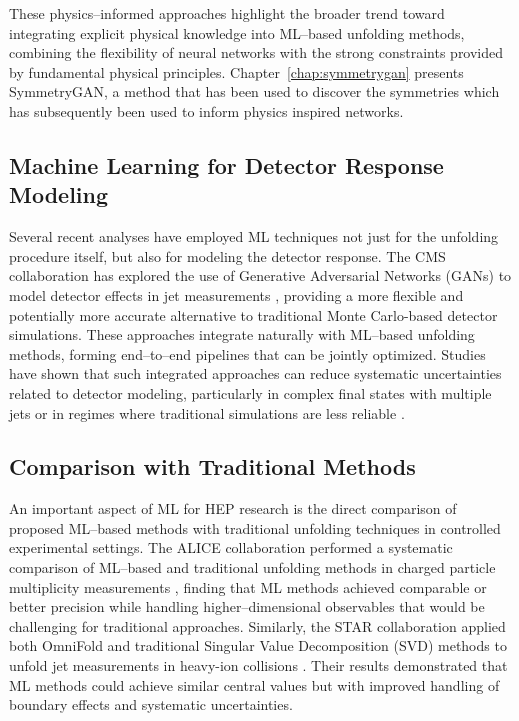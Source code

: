     These physics--informed approaches highlight the broader trend toward integrating explicit physical knowledge into ML--based unfolding methods, combining the flexibility of neural networks with the strong constraints provided by fundamental physical principles.
    Chapter~\ref{chap:symmetrygan} presents SymmetryGAN, a method that has been used to discover the symmetries which has subsequently been used to inform physics inspired networks.
\subsection{Machine Learning for Detector Response Modeling}
    Several recent analyses have employed ML techniques not just for the unfolding procedure itself, but also for modeling the detector response.
    The CMS collaboration has explored the use of Generative Adversarial Networks (GANs) to model detector effects in jet measurements , providing a more flexible and potentially more accurate alternative to traditional Monte Carlo-based detector simulations.
    These approaches integrate naturally with ML--based unfolding methods, forming end--to--end pipelines that can be jointly optimized.
    Studies have shown that such integrated approaches can reduce systematic uncertainties related to detector modeling, particularly in complex final states with multiple jets or in regimes where traditional simulations are less reliable .

\subsection{Comparison with Traditional Methods}
    An important aspect of ML for HEP research is the direct comparison of proposed ML--based methods with traditional unfolding techniques in controlled experimental settings.
    The ALICE collaboration performed a systematic comparison of ML--based and traditional unfolding methods in charged particle multiplicity measurements , finding that ML methods achieved comparable or better precision while handling higher--dimensional observables that would be challenging for traditional approaches.
    Similarly, the STAR collaboration applied both OmniFold and traditional Singular Value Decomposition (SVD) methods to unfold jet measurements in heavy-ion collisions .
    Their results demonstrated that ML methods could achieve similar central values but with improved handling of boundary effects and systematic uncertainties.

